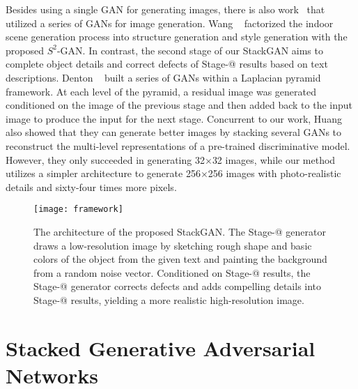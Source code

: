 \documentclass[10pt,twocolumn,letterpaper]{article}
\makeatletter
\newcommand{\Rmnum}[1]{\expandafter\@slowromancap\romannumeral #1@}
\makeatother
\begin{document}
Besides using a single GAN for generating images, there is also work~\cite{WangG16, DentonCSF15,huang2016sgan} that utilized a series of GANs for image generation. Wang \etal~\cite{WangG16} factorized the indoor scene generation process into structure generation and style generation with the proposed $S^2$-GAN. In contrast, the second stage of our StackGAN aims to complete object details and correct defects of Stage-\Rmnum{1} results based on text descriptions. Denton \etal~\cite{DentonCSF15} built a series of GANs within a Laplacian pyramid framework. At each level of the pyramid, a residual image was generated conditioned on the image of the previous stage and then added back to the input image to produce the input for the next stage. Concurrent to our work, Huang \etal~\cite{huang2016sgan} also showed that they can generate better images by stacking several GANs to reconstruct the multi-level representations of a pre-trained discriminative model. However, they only succeeded in generating 32$\times$32 images, while our method utilizes a simpler architecture to generate 256$\times$256 images with photo-realistic details and sixty-four times more pixels.


\begin{figure*}[tb]
\begin{center}
\texttt{[image: framework]}
\caption{The architecture of the proposed StackGAN. The Stage-\Rmnum{1} generator draws a low-resolution image by sketching rough shape and basic colors of the object from the given text and painting the background from a random noise vector. Conditioned on Stage-\Rmnum{1} results, the Stage-\Rmnum{2} generator corrects defects and adds compelling details into Stage-\Rmnum{1} results, yielding a more realistic high-resolution image.
   }
	\vspace{-12pt}
\end{center}
\label{fig:framework}
\end{figure*}


\vspace{-2pt}
\section{Stacked Generative Adversarial Networks}
\vspace{-5pt}
\end{document}
